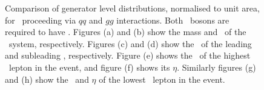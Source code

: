\begin{figure}
{    }
        \vspace{-2mm}
        \vspace{-2mm}
    \caption{\small Comparison of generator level distributions, normalised to
    unit area, for \ZZllll\ proceeding via $qq$ and $gg$ interactions. Both \Z\
    bosons are required to have \sstooosZ. Figures (a)
    and (b) show the mass and \pt\ of the \ZZ\ system,
    respectively. Figures (c) and (d) show the \pt\ of the
    leading and subleading \Z, respectively. Figure (e) shows the \pt\ of the highest \pt\ lepton in the event, and figure (f) shows its
   $\eta$. Similarly figures (g) and (h) show the \pt\ and $\eta$ of the lowest
   \pt\ lepton in the event.}
    \label{fig:gen-comp-gg-qq-ZZ}
\end{figure}


